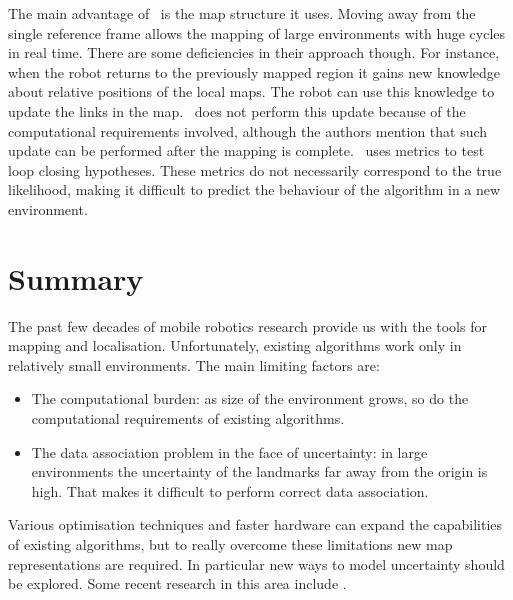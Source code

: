 The main advantage of \Atlas\ is the map structure it uses. Moving
away from the single reference frame allows the mapping of large
environments with huge cycles in real time. There are some
deficiencies in their approach though. For instance, when the robot
returns to the previously mapped region it gains new knowledge about
relative positions of the local maps. The robot can use this knowledge
to update the links in the map. \Atlas\ does not perform this update
because of the computational requirements involved, although the
authors mention that such update can be performed after the mapping is
complete. \Atlas\ uses metrics to test loop closing hypotheses. These
metrics do not necessarily correspond to the true likelihood, making
it difficult to predict the behaviour of the algorithm in a new
environment. 


\section{Summary}


The past few decades of mobile robotics research provide us with
the tools for mapping and localisation. Unfortunately, existing
algorithms work only in relatively small environments. The main
limiting factors are:

\begin{itemize}
\item The computational burden: as size of the environment grows, so do
  the computational requirements of existing algorithms.

\item The data association problem in the face of uncertainty: 
   in large environments the uncertainty of the landmarks far away
  from the origin is high. That makes it difficult to perform correct
  data association.

\end{itemize}

Various optimisation techniques and faster hardware can expand the
capabilities of existing algorithms, but to really overcome these
limitations new map representations are required. In particular new
ways to model uncertainty should be explored. Some recent research in
this area include \cite{bosse03atlas,fergusson2003}.

